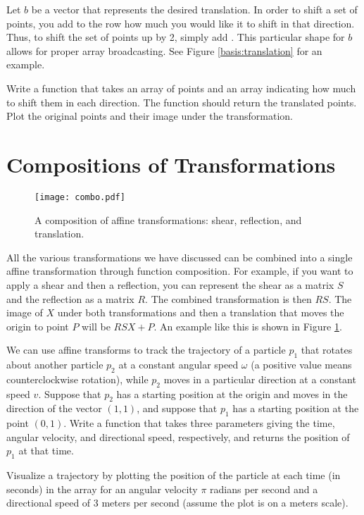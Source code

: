 Let $b$ be a vector that represents the desired translation.
In order to shift a set of points, you add to the row how much you would like it to shift
in that direction. Thus, to shift the set of points up by 2, simply add .
This particular shape for $b$ allows for proper array broadcasting.
See Figure \ref{basis:translation} for an example.

\begin{problem}
Write a function that takes an array of points and an array indicating how much to shift
them in each direction. The function should return the translated points.
Plot the original points and their image under the transformation.
\end{problem}

\section*{Compositions of Transformations}
\begin{figure}
\centering
\texttt{[image: combo.pdf]}
\caption{
A composition of affine transformations: shear, reflection, and translation.}
\label{basis:combo}
\end{figure}
All the various transformations we have discussed can be combined into a single affine transformation through function composition.
For example, if you want to apply a shear and then a reflection, you can represent the
shear as a matrix $S$ and the reflection as a matrix $R$. The combined transformation is then $RS$.
The image of $X$ under both transformations and then a translation that moves the origin to point $P$ will be $RSX+P$.
An example like this is shown in Figure \ref{basis:combo}.

\begin{problem}
We can use affine transforms to track the trajectory of a particle $p_1$ that rotates about
another particle $p_2$ at a constant angular speed $\omega$ (a positive value means
counterclockwise rotation), while $p_2$ moves in a particular
direction at a constant speed $v$. Suppose that $p_2$ has a starting position at the origin and
moves in the direction of the vector $(1, 1)$, and suppose that $p_1$ has a starting position
at the point $(0,1)$. Write a function that takes three parameters giving the time, angular
velocity, and directional speed, respectively, and returns the position of $p_1$ at that time.

Visualize a trajectory by plotting the position of the particle at each time (in seconds) in the array
 for an angular velocity $\pi$ radians per second and a
directional speed of 3 meters per second (assume the plot is on a meters scale).
\end{problem}

